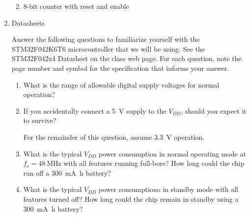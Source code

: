 \documentclass{e85}
\begin{document}
\begin{enumerate}
\begin{enumerate}
    \begin{solution}
    \end{solution}

  \item 8-bit counter with reset and enable

    \begin{solution}
    \end{solution}
  \end{enumerate}

\item Datasheets

  Answer the following questions to familiarize yourself with the
  STM32F042K6T6 microcontroller that we will be using.  See the
  STM32F042x4 Datasheet on the class web page.  For each question,
  note the page number and symbol for the specification that informs
  your answer.
  \begin{enumerate}
  \item What is the range of allowable digital supply voltages for
    normal operation?

    \begin{solution}
    \end{solution}

  \item If you accidentally connect a \SI{5}{\V} supply to the
    \(V_{DD}\), should you expect it to survive?

    \begin{solution}
    \end{solution}

    For the remainder of this question, assume \SI{3.3}{\V} operation.

  \item What is the typical \(V_{DD}\) power consumption in normal
    operating mode at \(f_c = \SI{48}{\MHz}\) with all features
    running full-bore?  How long could the chip run off a \SI{300}{\mA
      \hour} battery?

    \begin{solution}
    \end{solution}

  \item What is the typical \(V_{DD}\) power consumptiono in standby
    mode with all features turned off?  How long could the chip remain
    in standby using a \SI{300}{\mA \hour} battery?

    \begin{solution}
    \end{solution}


\end{enumerate}
\end{enumerate}
\end{document}
